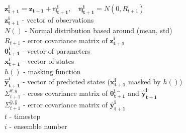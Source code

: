 \documentclass[12pt,twoside]{mitthesis}
\begin{document}
\pagestyle{plain}

$\mathbf{z_{t+1}^{i}} = \mathbf{z_{t+1}} + \mathbf{\eta_{t+1}^{i}},\quad \mathbf{\eta_{t+1}^{i}} = N(0,R_{t+1})$
\\
$\mathbf{z_{t+1}^{i}}$ - vector of observations
\\
$N()$ - Normal distribution based around (mean, std)
\\
$R_{t+1}$ - error covariance matrix of $\mathbf{z_{t+1}^{i}}$
\\
$\mathbf{\theta_{t+1}^{i-}}$ - vector of parameters
\\
$\mathbf{x_{t+1}^{i}}$ - vector of states
\\
$h()$ - masking function
\\
$\mathbf{\hat{y}_{t+1}^{i}}$ - vector of predicted states ($\mathbf{x_{t+1}^{i}}$ masked by $h()$)
\\
$\Sigma^{\theta,\hat{y}}_{t+1}$ - cross covariance matrix of $\mathbf{\theta_{t+1}^{i-}}$ and $\mathbf{\hat{y}_{t+1}^{i}}$
\\
$\Sigma^{\hat{y},\hat{y}}_{t+1}$ - error covariance matrix of $\mathbf{\hat{y}_{t+1}^{i}}$
\\
$t$ - timestep
\\
$i$ - ensemble number
\end{document}
